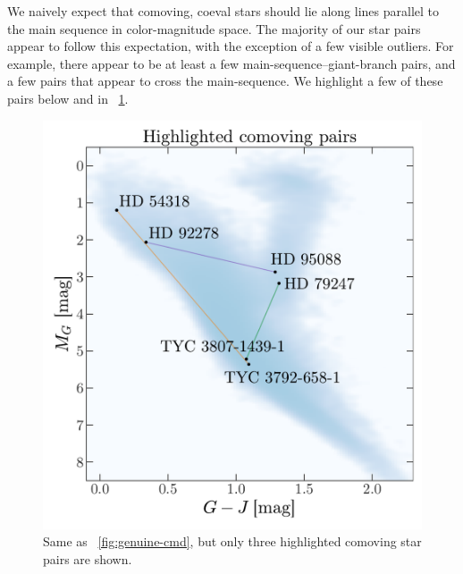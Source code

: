 \documentclass[modern, letterpaper]{aastex61}
\begin{document}
We naively expect that comoving, coeval stars should lie along lines parallel to
the main sequence in color-magnitude space. The majority of our star pairs
appear to follow this expectation, with the exception of a few visible outliers.
For example, there appear to be at least a few main-sequence--giant-branch
pairs, and a few pairs that appear to cross the main-sequence.
We highlight a few of these pairs below and in
\figurename~\ref{fig:highlighted-cmd}.

\begin{figure}[htbp]
  \begin{center}
    \includegraphics[width=0.8\linewidth]{highlighted_cmd.pdf}
  \end{center}
  \caption{%
    Same as \figurename~\ref{fig:genuine-cmd}, but only three highlighted
    comoving star pairs are shown.
    \label{fig:highlighted-cmd}}
\end{figure}
\end{document}

